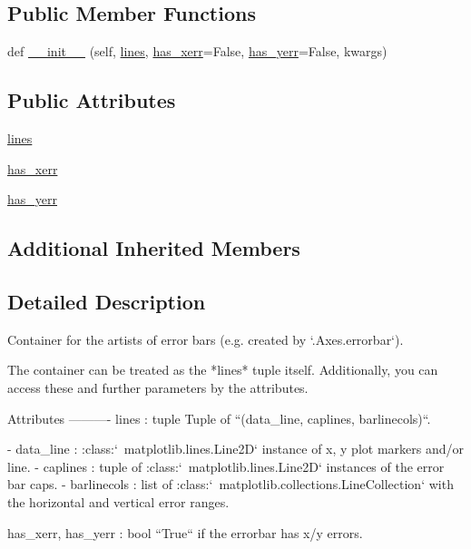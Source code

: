 \subsection*{Public Member Functions}
\begin{DoxyCompactItemize}
\item 
def \hyperlink{classmatplotlib_1_1container_1_1ErrorbarContainer_a5d072f663f83604777329c55f0c4e084}{\+\_\+\+\_\+init\+\_\+\+\_\+} (self, \hyperlink{classmatplotlib_1_1container_1_1ErrorbarContainer_a973b1efc892570103fc08fd4ec5a4ca0}{lines}, \hyperlink{classmatplotlib_1_1container_1_1ErrorbarContainer_a19a91f49d841aab29234e3f4d56f5885}{has\+\_\+xerr}=False, \hyperlink{classmatplotlib_1_1container_1_1ErrorbarContainer_a7387c8dcbec9a677ac26f7f373ae89a2}{has\+\_\+yerr}=False, kwargs)
\end{DoxyCompactItemize}
\subsection*{Public Attributes}
\begin{DoxyCompactItemize}
\item 
\hyperlink{classmatplotlib_1_1container_1_1ErrorbarContainer_a973b1efc892570103fc08fd4ec5a4ca0}{lines}
\item 
\hyperlink{classmatplotlib_1_1container_1_1ErrorbarContainer_a19a91f49d841aab29234e3f4d56f5885}{has\+\_\+xerr}
\item 
\hyperlink{classmatplotlib_1_1container_1_1ErrorbarContainer_a7387c8dcbec9a677ac26f7f373ae89a2}{has\+\_\+yerr}
\end{DoxyCompactItemize}
\subsection*{Additional Inherited Members}


\subsection{Detailed Description}
\begin{DoxyVerb}Container for the artists of error bars (e.g. created by `.Axes.errorbar`).

The container can be treated as the *lines* tuple itself.
Additionally, you can access these and further parameters by the
attributes.

Attributes
----------
lines : tuple
    Tuple of ``(data_line, caplines, barlinecols)``.

    - data_line : :class:`~matplotlib.lines.Line2D` instance of
      x, y plot markers and/or line.
    - caplines : tuple of :class:`~matplotlib.lines.Line2D` instances of
      the error bar caps.
    - barlinecols : list of :class:`~matplotlib.collections.LineCollection`
      with the horizontal and vertical error ranges.

has_xerr, has_yerr : bool
    ``True`` if the errorbar has x/y errors.\end{DoxyVerb}
 

